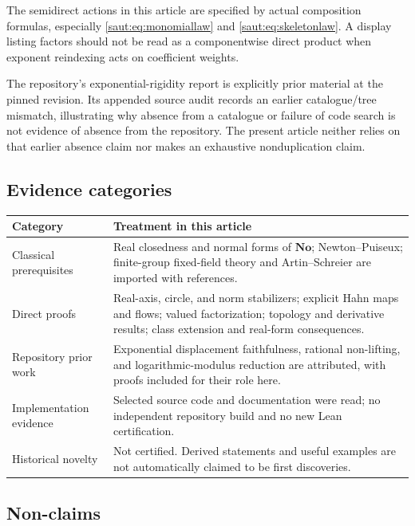 \documentclass[11pt]{article}
\theoremstyle{definition}
\theoremstyle{remark}
\newcommand{\No}{\mathbf{No}}
\numberwithin{equation}{section}
\begin{document}
The semidirect actions in this article are specified by actual composition
formulas, especially \eqref{saut:eq:monomiallaw} and \eqref{saut:eq:skeletonlaw}.
A display listing factors should not be read as a componentwise direct
product when exponent reindexing acts on coefficient weights.

The repository's exponential-rigidity report is explicitly prior material
at the pinned revision. Its appended source audit records an earlier
catalogue/tree mismatch, illustrating why absence from a catalogue or
failure of code search is not evidence of absence from the repository.
The present article neither relies on that earlier absence claim nor
makes an exhaustive nonduplication claim.

\subsection{Evidence categories}

\begin{center}
\small
\begin{tabular}{@{}>{\RaggedRight\arraybackslash}p{}>{\RaggedRight\arraybackslash}p{}@{}}
\toprule
Category & Treatment in this article\\
\midrule
Classical prerequisites & Real closedness and normal forms of $\No$;
Newton--Puiseux; finite-group fixed-field theory and Artin--Schreier are
imported with references.\\[3pt]
Direct proofs & Real-axis, circle, and norm stabilizers; explicit Hahn maps
and flows; valued factorization; topology and derivative results;
class extension and real-form consequences.\\[3pt]
Repository prior work & Exponential displacement faithfulness, rational
non-lifting, and logarithmic-modulus reduction are attributed, with proofs
included for their role here.\\[3pt]
Implementation evidence & Selected source code and documentation were read;
no independent repository build and no new Lean certification.\\[3pt]
Historical novelty & Not certified. Derived statements and useful examples
are not automatically claimed to be first discoveries.\\
\bottomrule
\end{tabular}
\end{center}

\subsection{Non-claims}\label{saut:sec:nonclaims}
\end{document}
